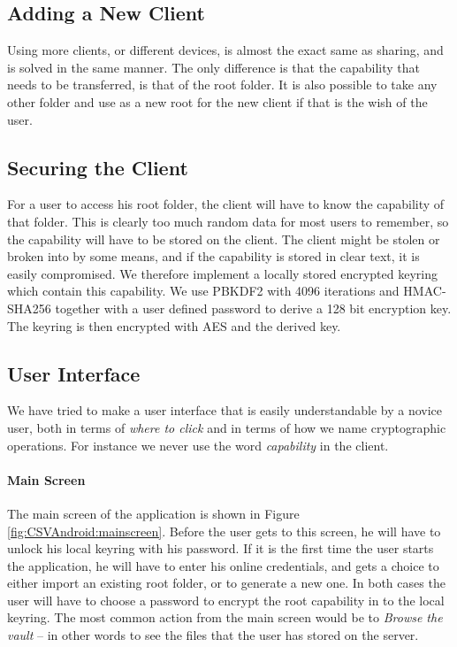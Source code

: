 \documentclass[pdftex,english,10pt,b5paper,twoside]{book}
\begin{document}
\subsection{Adding a New Client}

Using more clients, or different devices, is almost the exact same as sharing,
and is solved in the same manner. The only difference is that the capability
that needs to be transferred, is that of the root folder. It is also possible
to take any other folder and use as a new root for the new client if that is
the wish of the user.

\subsection{Securing the Client}

For a user to access his root folder, the client will have to know the
capability of that folder. This is clearly too much random data for most users
to remember, so the capability will have to be stored on the client.  The
client might be stolen or broken into by some means, and if the capability is
stored in clear text, it is easily compromised. We therefore implement a
locally stored encrypted keyring which contain this capability. We use
\ac{PBKDF2} with 4096 iterations and \ac{HMAC}-\ac{SHA}256 together with a user
defined password to derive a 128 bit encryption key. The keyring is then
encrypted with \ac{AES} and the derived key.

\subsection{User Interface}

We have tried to make a user interface that is easily understandable by a
novice user, both in terms of \emph{where to click} and in terms of how we name
cryptographic operations. For instance we never use the word \emph{capability}
in the client.

\paragraph{Main Screen}

The main screen of the application is shown in Figure
\ref{fig:CSVAndroid:mainscreen}. Before the user gets to this screen, he will
have to unlock his local keyring with his password. If it is the first time the
user starts the application, he will have to enter his online credentials, and
gets a choice to either import an existing root folder, or to generate a new
one. In both cases the user will have to choose a password to encrypt the root
capability in to the local keyring. The most common action from the main screen
would be to \emph{Browse the vault} -- in other words to see the files that the
user has stored on the server.
\end{document}
